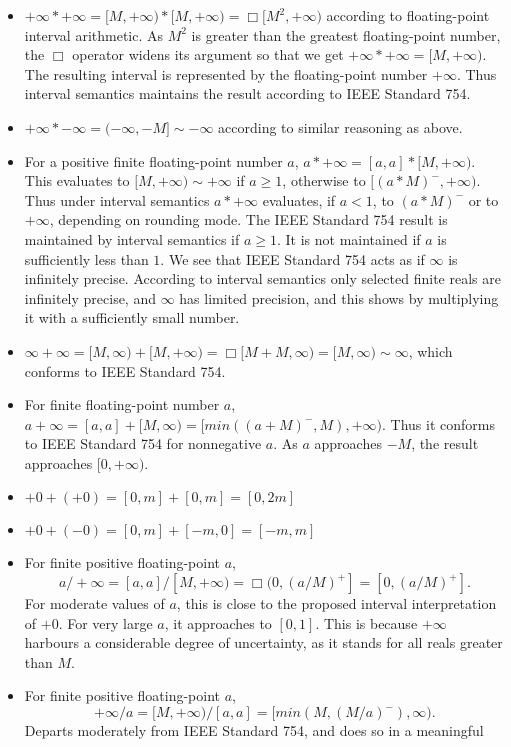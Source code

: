 \documentclass[11pt]{article}
\begin{document}
\begin{itemize}
\item
$+\infty * +\infty = [M,+\infty)*[M,+\infty) = \Box [M^2, +\infty)$
according to floating-point interval arithmetic.
As $M^2$ is greater than the greatest floating-point number,
the $\Box$ operator widens its argument so that we get
$+\infty * +\infty = [M, +\infty)$.
The resulting interval is represented by the floating-point number $+\infty$.
Thus interval semantics maintains the result according to IEEE Standard 754.
\item
$+\infty * -\infty = (-\infty, -M] \sim -\infty$ according to similar
reasoning as above.
\item
For a positive finite floating-point number $a$,
$a * +\infty = [a,a] * [M,+\infty)$.
This evaluates to $[M,+\infty) \sim +\infty$ if $a \geq 1$,
otherwise to $[(a*M)^-, +\infty)$.
Thus under interval semantics $a * +\infty$ evaluates, if $a < 1$, to
$(a*M)^-$ or to $+\infty$, depending on rounding mode.
The IEEE Standard 754 result is maintained by interval semantics if $a \geq 1$.
It is not maintained if $a$ is sufficiently less than $1$.
We see that IEEE Standard 754 acts as if $\infty$ is infinitely precise.
According to interval semantics only selected finite reals are
infinitely precise, and $\infty$ has limited precision,
and this shows by multiplying it with a sufficiently small number.
\item
$\infty + \infty = [M,\infty) + [M,+\infty) = \Box [M+M,\infty)
=[M,\infty) \sim \infty$,
which conforms to IEEE Standard 754.
\item
For finite floating-point number $a$,
$a+\infty = [a,a]+[M,\infty) = [min((a+M)^-, M),+\infty)$.
Thus it conforms to IEEE Standard 754 for nonnegative $a$.
As $a$ approaches $-M$, the  result approaches $[0,+\infty)$.
\item
$+0 + (+0) = [0,m] + [0,m] = [0,2m]$
\item
$+0 + (-0) = [0,m] + [-m,0] = [-m,m]$
\item
For finite positive floating-point $a$,
$$a/+\infty = [a,a]/[M,+\infty) = \Box (0,(a/M)^+] = [0,(a/M)^+].$$
For moderate values of $a$, this is close to the proposed interval
interpretation of $+0$. For very large $a$, it approaches to $[0,1]$.
This is because $+\infty$ harbours a considerable degree of
uncertainty, as it stands for all reals greater than $M$.
\item
For finite positive floating-point $a$,
$$+\infty/a = [M,+\infty)/[a,a] = [min(M, (M/a)^-), \infty).$$
Departs moderately from IEEE Standard 754, and does so in a meaningful

\end{itemize}
\end{document}
